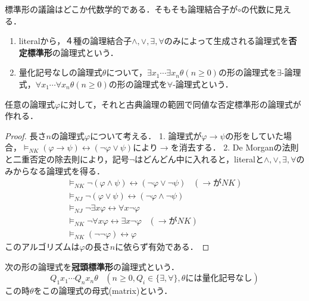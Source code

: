 \documentclass[uplatex, dvipdfmx]{jsreport}
\begin{document}
標準形の議論はどこか代数学的である．そもそも論理結合子が$\circ$の代数に見える．

\begin{definition}\mbox{}
    \begin{enumerate}
        \item literalから，４種の論理結合子$\land,\lor,\exists,\forall$のみによって生成される論理式を\textbf{否定標準形}の論理式という．
        \item 量化記号なしの論理式$\theta$について，$\exists x_1\cdots\exists x_n\theta(n\ge 0)$の形の論理式を$\exists$-論理式，$\forall x_1\cdots\forall x_n\theta(n\ge 0)$の形の論理式を$\forall$-論理式という．
    \end{enumerate}
\end{definition}

\begin{lemma}\label{lemma-negation-normal-form}
    任意の論理式$\varphi$に対して，それと古典論理の範囲で同値な否定標準形の論理式が作れる．
\end{lemma}
\begin{proof}
    長さ$n$の論理式$\varphi$について考える．
    1. 論理式が$\varphi\to\psi$の形をしていた場合，$\vDash_{NK}(\varphi\to\psi)\leftrightarrow(\lnot\varphi\lor\psi)$により$\to$を消去する．
    2. De Morganの法則と二重否定の除去則により，記号$\lnot$はどんどん中に入れると，literalと$\land,\lor,\exists,\forall$のみからなる論理式を得る．
    \begin{align*}
        \vDash_{NK}\lnot(\varphi\land\psi)\leftrightarrow (\lnot\varphi\lor\lnot\psi)\;\;\;(\rightarrow がNK)\\
        \vDash_{NJ}\lnot(\varphi\lor\psi)\leftrightarrow (\lnot\varphi\land\lnot\psi)\\
        \vDash_{NJ}\lnot\exists x\varphi\leftrightarrow \forall x\lnot\varphi\\
        \vDash_{NK}\lnot\forall x\varphi\leftrightarrow \exists x\lnot\varphi\;\;\;(\rightarrow がNK)\\
        \vDash_{NK}(\lnot\lnot\varphi)\leftrightarrow\varphi
    \end{align*}
    このアルゴリズムは$\varphi$の長さ$n$に依らず有効である．
\end{proof}

\begin{definition}
    次の形の論理式を\textbf{冠頭標準形}の論理式という．
    \[ Q_1x_1\cdots Q_nx_n\theta\;\;\;(n\ge 0,Q_i\in\{\exists,\forall\},\theta には量化記号なし) \]
    この時$\theta$をこの論理式の母式(matrix)という．
\end{definition}
\end{document}
